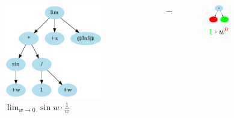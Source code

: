\documentclass[aspectratio=149]{beamer}
\begin{document}
	\begin{frame}
		\begin{columns}
			\begin{column}{0.45\textwidth}
				\begin{figure}
					\includegraphics[width=0.8\textwidth]{pres_img/rewritten.png}
					\caption{\(\lim_{w \to 0}{\sin{w} \cdot \frac{1}{w}}\)}
				\end{figure}
			\end{column}
			\begin{column}{0.1\textwidth}
				\begin{center}
					$\rightarrow$
				\end{center}
			\end{column}
			\begin{column}{0.45\textwidth}
				\begin{figure}
					\includegraphics[width=0.4\textwidth]{pres_img/series.png}
					\caption{\(\textcolor{green}{1} \cdot w^{\textcolor{red}{0}}\)}
				\end{figure}
			\end{column}
		\end{columns}
	\end{frame}
\end{document}

